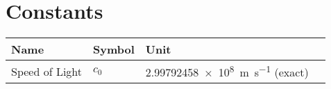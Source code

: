 %
        \chapter{Constants} \label{app_const}%

\begin{tabular}{l l l p{5cm}}
	\textbf{Name}  & \textbf{Symbol} & \textbf{Unit}                                \\ \hline

	Speed of Light & $c_{0}$         & \SI{2.99792458e8}{\meter\per\second} (exact) \\
\end{tabular}

%